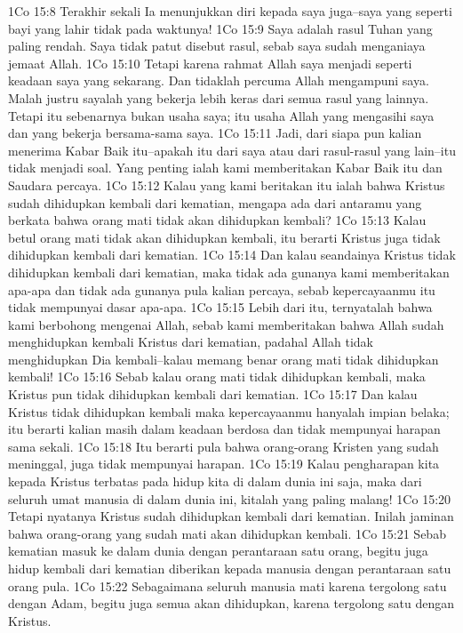 1Co 15:8  Terakhir sekali Ia menunjukkan diri kepada saya juga--saya yang seperti bayi yang lahir tidak pada waktunya!
1Co 15:9  Saya adalah rasul Tuhan yang paling rendah. Saya tidak patut disebut rasul, sebab saya sudah menganiaya jemaat Allah.
1Co 15:10  Tetapi karena rahmat Allah saya menjadi seperti keadaan saya yang sekarang. Dan tidaklah percuma Allah mengampuni saya. Malah justru sayalah yang bekerja lebih keras dari semua rasul yang lainnya. Tetapi itu sebenarnya bukan usaha saya; itu usaha Allah yang mengasihi saya dan yang bekerja bersama-sama saya.
1Co 15:11  Jadi, dari siapa pun kalian menerima Kabar Baik itu--apakah itu dari saya atau dari rasul-rasul yang lain--itu tidak menjadi soal. Yang penting ialah kami memberitakan Kabar Baik itu dan Saudara percaya.
1Co 15:12  Kalau yang kami beritakan itu ialah bahwa Kristus sudah dihidupkan kembali dari kematian, mengapa ada dari antaramu yang berkata bahwa orang mati tidak akan dihidupkan kembali?
1Co 15:13  Kalau betul orang mati tidak akan dihidupkan kembali, itu berarti Kristus juga tidak dihidupkan kembali dari kematian.
1Co 15:14  Dan kalau seandainya Kristus tidak dihidupkan kembali dari kematian, maka tidak ada gunanya kami memberitakan apa-apa dan tidak ada gunanya pula kalian percaya, sebab kepercayaanmu itu tidak mempunyai dasar apa-apa.
1Co 15:15  Lebih dari itu, ternyatalah bahwa kami berbohong mengenai Allah, sebab kami memberitakan bahwa Allah sudah menghidupkan kembali Kristus dari kematian, padahal Allah tidak menghidupkan Dia kembali--kalau memang benar orang mati tidak dihidupkan kembali!
1Co 15:16  Sebab kalau orang mati tidak dihidupkan kembali, maka Kristus pun tidak dihidupkan kembali dari kematian.
1Co 15:17  Dan kalau Kristus tidak dihidupkan kembali maka kepercayaanmu hanyalah impian belaka; itu berarti kalian masih dalam keadaan berdosa dan tidak mempunyai harapan sama sekali.
1Co 15:18  Itu berarti pula bahwa orang-orang Kristen yang sudah meninggal, juga tidak mempunyai harapan.
1Co 15:19  Kalau pengharapan kita kepada Kristus terbatas pada hidup kita di dalam dunia ini saja, maka dari seluruh umat manusia di dalam dunia ini, kitalah yang paling malang!
1Co 15:20  Tetapi nyatanya Kristus sudah dihidupkan kembali dari kematian. Inilah jaminan bahwa orang-orang yang sudah mati akan dihidupkan kembali.
1Co 15:21  Sebab kematian masuk ke dalam dunia dengan perantaraan satu orang, begitu juga hidup kembali dari kematian diberikan kepada manusia dengan perantaraan satu orang pula.
1Co 15:22  Sebagaimana seluruh manusia mati karena tergolong satu dengan Adam, begitu juga semua akan dihidupkan, karena tergolong satu dengan Kristus.

